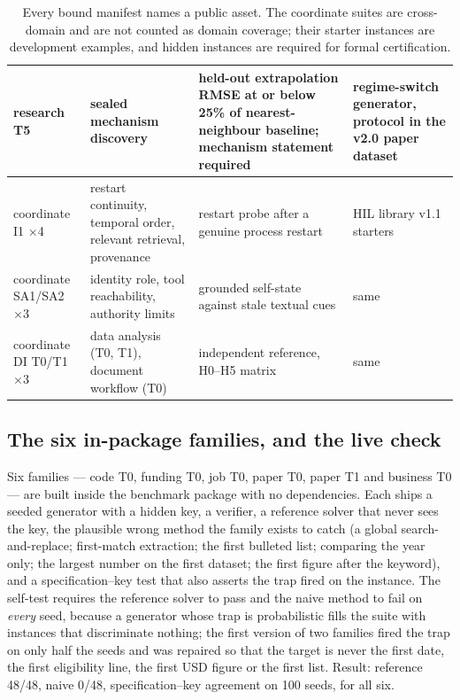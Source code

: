 \documentclass[11pt]{article}
\theoremstyle{definition}
\begin{document}
\begin{table}[H]
\begin{tabularx}{\textwidth}{@{}p{2.2cm}p{3.4cm}YY@{}}
research T5 & sealed mechanism discovery & held-out extrapolation RMSE at or below 25\% of nearest-neighbour baseline; mechanism statement required & regime-switch generator, protocol in the v2.0 paper dataset \\
\midrule
coordinate I1 $\times$4 & restart continuity, temporal order, relevant retrieval, provenance & restart probe after a genuine process restart & HIL library v1.1 starters \\
coordinate SA1/SA2 $\times$3 & identity role, tool reachability, authority limits & grounded self-state against stale textual cues & same \\
coordinate DI T0/T1 $\times$3 & data analysis (T0, T1), document workflow (T0) & independent reference, H0--H5 matrix & same \\
\bottomrule
\end{tabularx}
\caption{Every bound manifest names a public asset. The coordinate suites are cross-domain and are not counted as domain coverage; their starter instances are development examples, and hidden instances are required for formal certification.}
\label{tab:bound}
\end{table}

\subsection{The six in-package families, and the live check}

Six families --- code T0, funding T0, job T0, paper T0, paper T1 and business T0 --- are built inside the benchmark package with no dependencies. Each ships a seeded generator with a hidden key, a verifier, a reference solver that never sees the key, the plausible wrong method the family exists to catch (a global search-and-replace; first-match extraction; the first bulleted list; comparing the year only; the largest number on the first dataset; the first figure after the keyword), and a specification--key test that also asserts the trap fired on the instance. The self-test requires the reference solver to pass and the naive method to fail on \emph{every} seed, because a generator whose trap is probabilistic fills the suite with instances that discriminate nothing; the first version of two families fired the trap on only half the seeds and was repaired so that the target is never the first date, the first eligibility line, the first USD figure or the first list. Result: reference 48/48, naive 0/48, specification--key agreement on 100 seeds, for all six.
\end{document}
